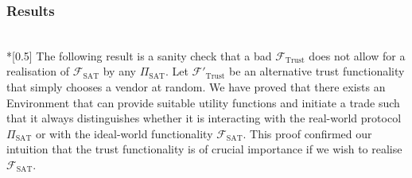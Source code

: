 \subsubsection{Results} \ \\*[0.5\baselineskip]
  The following result is a sanity check that a bad $\mathcal{F}_{\mathrm{Trust}}$ does
  not allow for a realisation of $\mathcal{F}_{\mathrm{SAT}}$ by any $\Pi_{\mathrm{SAT}}$.
  Let $\mathcal{F}'_{\mathrm{Trust}}$ be an alternative trust functionality that simply
  chooses a vendor at random. We have proved that there exists an Environment that can
  provide suitable utility functions and initiate a trade such that it always
  distinguishes whether it is interacting with the real-world protocol
  $\Pi_{\mathrm{SAT}}$ or with the ideal-world functionality $\mathcal{F}_{\mathrm{SAT}}$.
  This proof confirmed our intuition that the trust functionality is of crucial importance
  if we wish to realise $\mathcal{F}_{\mathrm{SAT}}$.
